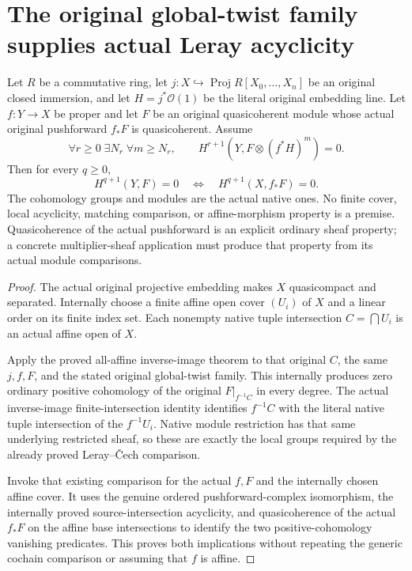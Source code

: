 \section{The original global-twist family supplies actual Leray acyclicity}
\label{sec:projective-acyclic-original-pushforward-cohomology}

\begin{theorem}
\label{thm:projective-acyclic-original-pushforward-higher-vanishing}
\leanok
Let $R$ be a commutative ring, let
$j:X\hookrightarrow\operatorname{Proj}R[X_0,\ldots,X_n]$ be an original
closed immersion, and let $H=j^*\mathcal O(1)$ be the literal original
embedding line. Let $f:Y\to X$ be proper and let $F$ be an original
quasicoherent module whose actual original pushforward $f_*F$ is
quasicoherent. Assume
\[
 \forall r\geq0\;\exists N_r\;\forall m\geq N_r,\qquad
 H^{r+1}(Y,F\otimes(f^*H)^m)=0.
\]
Then for every $q\geq0$,
\[
 H^{q+1}(Y,F)=0\quad\Longleftrightarrow\quad
 H^{q+1}(X,f_*F)=0.
\]
The cohomology groups and modules are the actual native ones. No finite
cover, local acyclicity, matching comparison, or affine-morphism property
is a premise. Quasicoherence of the actual pushforward is an explicit
ordinary sheaf property; a concrete multiplier-sheaf application must
produce that property from its actual module comparisons.
\end{theorem}
\begin{proof}
The actual original projective embedding makes $X$ quasicompact and
separated. Internally choose a finite affine open cover $(U_i)$ of $X$
and a linear order on its finite index set. Each nonempty native tuple
intersection $C=\bigcap U_i$ is an actual affine open of $X$.

Apply the proved all-affine inverse-image theorem to that original $C$,
the same $j,f,F$, and the stated original global-twist family. This
internally produces zero ordinary positive cohomology of the original
$F|_{f^{-1}C}$ in every degree. The actual inverse-image finite-intersection
identity identifies $f^{-1}C$ with the literal native tuple intersection
of the $f^{-1}U_i$. Native module restriction has that same underlying
restricted sheaf, so these are exactly the local groups required by the
already proved Leray--\v{C}ech comparison.

Invoke that existing comparison for the actual $f,F$ and the internally
chosen affine cover. It uses the genuine ordered pushforward-complex
isomorphism, the internally proved source-intersection acyclicity, and
quasicoherence of the actual $f_*F$ on the affine base intersections to
identify the two positive-cohomology vanishing predicates. This proves
both implications without repeating the generic cochain comparison or
assuming that $f$ is affine.
\end{proof}

